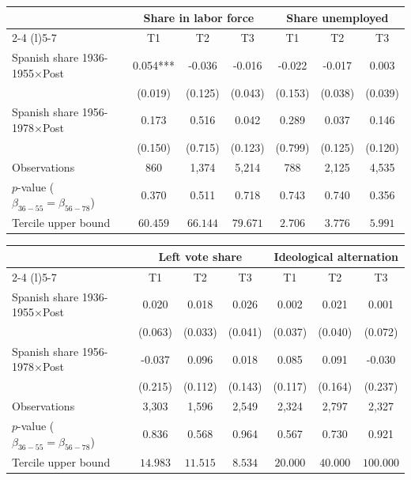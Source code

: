 \begin{table}[!h]
\begin{tabular*}{\textwidth}{l@{\extracolsep{\fill}}cccccc}
\hline
\end{tabular*}
\begin{tabular*}{\textwidth}{l@{\extracolsep{\fill}}cccccc}
& \multicolumn{3}{c}{Share in labor force} & \multicolumn{3}{c}{Share unemployed} \\
\cmidrule(l){2-4} \cmidrule(l){5-7}
& T1 & T2 & T3 & T1 & T2 & T3 \\
\hline
Spanish share 1936-1955$\times$Post & 0.054*** & -0.036 & -0.016 & -0.022 & -0.017 & 0.003 \\
 & (0.019) & (0.125) & (0.043) & (0.153) & (0.038) & (0.039) \\
Spanish share 1956-1978$\times$Post & 0.173 & 0.516 & 0.042 & 0.289 & 0.037 & 0.146 \\
  & (0.150) & (0.715) & (0.123) & (0.799) & (0.125) & (0.120) \\
\addlinespace
Observations & 860 & 1,374 & 5,214 & 788 & 2,125 & 4,535 \\
$p$-value ($\beta_{36{-}55} = \beta_{56{-}78}$) & 0.370 & 0.511 & 0.718 & 0.743 & 0.740 & 0.356 \\
Tercile upper bound & $60.459$ & $66.144$ & $79.671$ & $2.706$ & $3.776$ & $5.991$ \\
\hline
\end{tabular*}
\begin{tabular*}{\textwidth}{l@{\extracolsep{\fill}}cccccc}
& \multicolumn{3}{c}{Left vote share} & \multicolumn{3}{c}{Ideological alternation} \\
\cmidrule(l){2-4} \cmidrule(l){5-7}
& T1 & T2 & T3 & T1 & T2 & T3 \\
\hline
Spanish share 1936-1955$\times$Post & 0.020 & 0.018 & 0.026 & 0.002 & 0.021 & 0.001 \\
 & (0.063) & (0.033) & (0.041) & (0.037) & (0.040) & (0.072) \\
Spanish share 1956-1978$\times$Post & -0.037 & 0.096 & 0.018 & 0.085 & 0.091 & -0.030 \\
  & (0.215) & (0.112) & (0.143) & (0.117) & (0.164) & (0.237) \\
\addlinespace
Observations & 3,303 & 1,596 & 2,549 & 2,324 & 2,797 & 2,327 \\
$p$-value ($\beta_{36{-}55} = \beta_{56{-}78}$) & 0.836 & 0.568 & 0.964 & 0.567 & 0.730 & 0.921 \\
Tercile upper bound & $14.983$ & $11.515$ & $8.534$ & $20.000$ & $40.000$ & $100.000$ \\
\hline
\end{tabular*}
\addvspace{0.2em}
\captionsetup{font=footnotesize, justification=justified, singlelinecheck=false}

\end{table}
